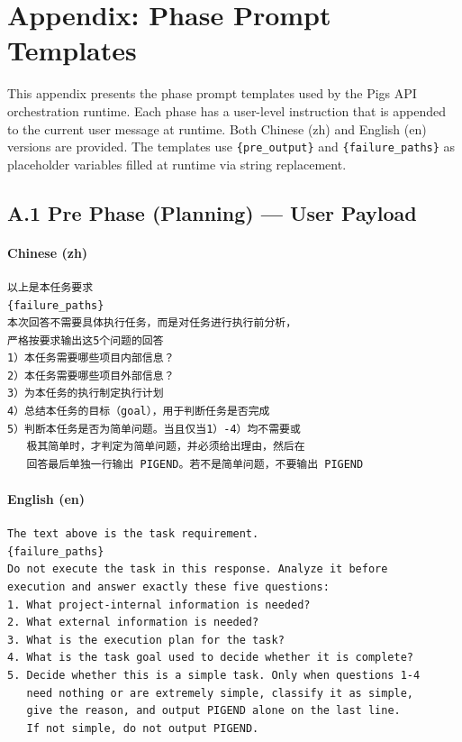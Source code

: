 \section*{Appendix: Phase Prompt Templates}
\label{sec:appendix}

This appendix presents the phase prompt templates used by the Pigs API orchestration runtime. Each phase has a user-level instruction that is appended to the current user message at runtime. Both Chinese (zh) and English (en) versions are provided. The templates use \texttt{\{pre\_output\}} and \texttt{\{failure\_paths\}} as placeholder variables filled at runtime via string replacement.

\subsection*{A.1 Pre Phase (Planning) --- User Payload}

\paragraph*{Chinese (zh)}
\begin{lstlisting}[basicstyle=\ttfamily\scriptsize, frame=single]
以上是本任务要求
{failure_paths}
本次回答不需要具体执行任务，而是对任务进行执行前分析，
严格按要求输出这5个问题的回答
1）本任务需要哪些项目内部信息？
2）本任务需要哪些项目外部信息？
3）为本任务的执行制定执行计划
4）总结本任务的目标（goal），用于判断任务是否完成
5）判断本任务是否为简单问题。当且仅当1）-4）均不需要或
   极其简单时，才判定为简单问题，并必须给出理由，然后在
   回答最后单独一行输出 PIGEND。若不是简单问题，不要输出 PIGEND
\end{lstlisting}

\paragraph*{English (en)}
\begin{lstlisting}[basicstyle=\ttfamily\scriptsize, frame=single]
The text above is the task requirement.
{failure_paths}
Do not execute the task in this response. Analyze it before
execution and answer exactly these five questions:
1. What project-internal information is needed?
2. What external information is needed?
3. What is the execution plan for the task?
4. What is the task goal used to decide whether it is complete?
5. Decide whether this is a simple task. Only when questions 1-4
   need nothing or are extremely simple, classify it as simple,
   give the reason, and output PIGEND alone on the last line.
   If not simple, do not output PIGEND.
\end{lstlisting}

